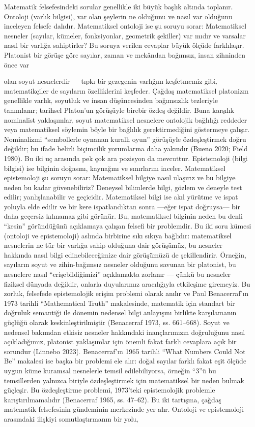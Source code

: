 Matematik felsefesindeki sorular genellikle iki büyük başlık altında toplanır. Ontoloji (varlık bilgisi), var olan şeylerin ne olduğunu ve nasıl var olduğunu inceleyen felsefe dalıdır. Matematiksel ontoloji ise şu soruyu sorar: Matematiksel nesneler (sayılar, kümeler, fonksiyonlar, geometrik şekiller) var mıdır ve varsalar nasıl bir varlığa sahiptirler? Bu soruya verilen cevaplar büyük ölçüde farklılaşır. Platonist bir görüşe göre sayılar, zaman ve mekândan bağımsız, insan zihninden önce var

olan soyut nesnelerdir — tıpkı bir gezegenin varlığını keşfetmemiz gibi, matematikçiler de sayıların özelliklerini keşfeder. Çağdaş matematiksel platonizm genellikle varlık, soyutluk ve insan düşüncesinden bağımsızlık tezleriyle tanımlanır; tarihsel Platon’un görüşüyle birebir özdeş değildir. Buna karşılık nominalist yaklaşımlar, soyut matematiksel nesnelere ontolojik bağlılığı reddeder veya matematiksel söylemin böyle bir bağlılık gerektirmediğini göstermeye çalışır. Nominalizmi “sembollerle oynanan kurallı oyun” görüşüyle özdeşleştirmek doğru değildir; bu ifade belirli biçimcilik yorumlarına daha yakındır (Bueno 2020; Field 1980). Bu iki uç arasında pek çok ara pozisyon da mevcuttur. Epistemoloji (bilgi bilgisi) ise bilginin doğasını, kaynağını ve sınırlarını inceler. Matematiksel epistemoloji şu soruyu sorar: Matematiksel bilgiye nasıl ulaşırız ve bu bilgiye neden bu kadar güvenebiliriz? Deneysel bilimlerde bilgi, gözlem ve deneyle test edilir; yanlışlanabilir ve geçicidir. Matematiksel bilgi ise akıl yürütme ve ispat yoluyla elde edilir ve bir kere ispatlandıktan sonra —eğer ispat doğruysa— bir daha geçersiz kılınamaz gibi görünür. Bu, matematiksel bilginin neden bu denli “kesin” göründüğünü açıklamaya çalışan felsefi bir problemdir. Bu iki soru kümesi (ontoloji ve epistemoloji) aslında birbirine sıkı sıkıya bağlıdır: matematiksel nesnelerin ne tür bir varlığa sahip olduğuna dair görüşümüz, bu nesneler hakkında nasıl bilgi edinebileceğimize dair görüşümüzü de şekillendirir. Örneğin, sayıların soyut ve zihin-bağımsız nesneler olduğunu savunan bir platonist, bu nesnelere nasıl “erişebildiğimizi” açıklamakta zorlanır — çünkü bu nesneler fiziksel dünyada değildir, onlarla duyularımız aracılığıyla etkileşime giremeyiz. Bu zorluk, felsefede epistemolojik erişim problemi olarak anılır ve Paul Benacerraf’ın 1973 tarihli “Mathematical Truth” makalesinde, matematik için standart bir doğruluk semantiği ile dönemin nedensel bilgi anlayışını birlikte karşılamanın güçlüğü olarak keskinleştirilmiştir (Benacerraf 1973, ss. 661–668). Soyut ve nedensel bakımdan etkisiz nesneler hakkındaki inançlarımızın doğruluğunu nasıl açıkladığımız, platonist yaklaşımlar için önemli fakat farklı cevaplara açık bir sorundur (Linnebo 2023). Benacerraf’ın 1965 tarihli “What Numbers Could Not Be” makalesi ise başka bir problemi ele alır: doğal sayılar farklı fakat eşit ölçüde uygun küme kuramsal nesnelerle temsil edilebiliyorsa, örneğin “3”ü bu temsillerden yalnızca biriyle özdeşleştirmek için matematiksel bir neden bulmak güçleşir. Bu özdeşleştirme problemi, 1973’teki epistemolojik problemle karıştırılmamalıdır (Benacerraf 1965, ss. 47–62). Bu iki tartışma, çağdaş matematik felsefesinin gündeminin merkezinde yer alır. Ontoloji ve epistemoloji arasındaki ilişkiyi somutlaştırmanın bir yolu,

